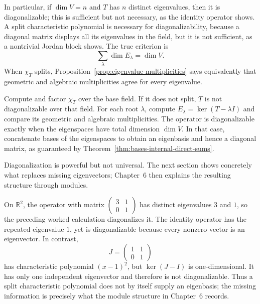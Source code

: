 In particular, if \(\dim V=n\) and \(T\) has \(n\) distinct eigenvalues,
then it is diagonalizable; this is sufficient but not necessary, as the
identity operator shows. A split characteristic polynomial is necessary for
diagonalizability, because a diagonal matrix displays all its eigenvalues in
the field, but it is not sufficient, as a nontrivial Jordan block shows. The
true criterion is
\[
\sum_\lambda\dim E_\lambda=\dim V.
\]
When \(\chi_T\) splits, Proposition~\ref{prop:eigenvalue-multiplicities} says equivalently
that geometric and algebraic multiplicities agree for every eigenvalue.

\begin{remark}
Compute and factor \(\chi_T\) over the base field. If it does not split,
\(T\) is not diagonalizable over that field. For each root \(\lambda\),
compute \(E_\lambda=\ker(T-\lambda I)\) and compare its geometric and
algebraic multiplicities. The operator is diagonalizable exactly when the
eigenspaces have total dimension \(\dim V\). In that case, concatenate bases
of the eigenspaces to obtain an eigenbasis and hence a diagonal matrix, as
guaranteed by Theorem~\ref{thm:bases-internal-direct-sums}.
\end{remark}

Diagonalization is powerful but not universal. The next section shows
concretely what replaces missing eigenvectors; Chapter~6 then explains the
resulting structure through modules.

\begin{example}
On \(\mathbb R^2\), the operator with matrix
\(\begin{pmatrix}3&1\\0&1\end{pmatrix}\) has distinct eigenvalues \(3\) and
\(1\), so the preceding worked calculation diagonalizes it. The identity
operator has the repeated eigenvalue \(1\), yet is diagonalizable because
every nonzero vector is an eigenvector. In contrast,
\[J=\begin{pmatrix}1&1\\0&1\end{pmatrix}\]
has characteristic polynomial \((x-1)^2\), but
\(\ker(J-I)\) is one-dimensional. It has only one independent eigenvector
and therefore is not diagonalizable. Thus a split characteristic polynomial
does not by itself supply an eigenbasis; the missing information is precisely
what the module structure in Chapter~6 records.
\end{example}

